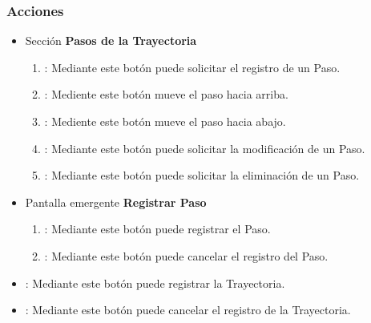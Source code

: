 \subsubsection{Acciones}
\begin{itemize}
 \item Sección \textbf{Pasos de la Trayectoria}
  \begin{enumerate}
	\item {}: Mediante este botón puede solicitar el registro de un Paso.
	\item {}: Mediente este botón mueve el paso hacia arriba.
	\item {}: Mediente este botón mueve el paso hacia abajo.
	\item {}: Mediante este botón puede solicitar la modificación de un Paso.
	\item {}: Mediante este botón puede solicitar la eliminación de un Paso.
  \end{enumerate}
  \item Pantalla emergente \textbf{Registrar Paso}
  \begin{enumerate}
	\item {}: Mediante este botón puede registrar el Paso.
	\item {}: Mediante este botón puede cancelar el registro del Paso.
  \end{enumerate}
  \item {}: Mediante este botón puede registrar la Trayectoria.
  \item {}: Mediante este botón puede cancelar el registro de la Trayectoria.
\end{itemize}
	
	
